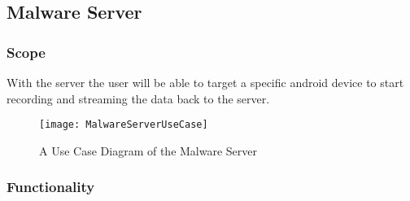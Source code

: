 
\begin{comment}
Template vir elke funksie
        \paragraph{}
			\begin{description}
			    \item{\textbf{Priority}:} %
			    \item{\textbf{Service Contract}:}%
			    \item{\textbf{Pre-conditions}:}%
    			    \begin{itemize}
    			        \item %
    			        \item %
    			    \end{itemize}
			    \item{\textbf{Post-conditions}:} %
    			    \begin{itemize}
    			    \item %
    			    \item %
    			    \end{itemize}
			\end{description}
\end{comment}




\subsection{Malware Server}

    \subsubsection{Scope}
	With the server the user will be able to target a specific android device to start recording and streaming the data back to the server.
		\begin{figure}[H]
 			 \centering
			  \texttt{[image: MalwareServerUseCase]}
		 	 \caption{A Use Case Diagram of the Malware Server}
		\end{figure}
	
	
	\subsubsection{Functionality}
   
